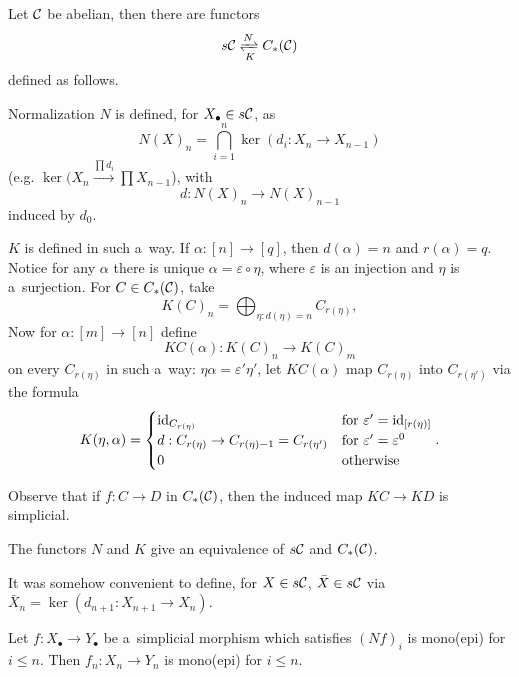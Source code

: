 \pagebreak    
    \begin{definition}
        Let $\mathcal{C}$ be abelian, then there are functors 
        $$ s\C \xrightleftharpoons[K]{N} C_\ast(\C)$$
        defined as follows.
        
        Normalization $N$ is defined, for $X_\bullet \in s\mathcal{C}$, as
        $$N(X)_n = \bigcap_{i=1}^n \ker(d_i:X_n \to X_{n-1})$$
        (e.g. $\ker (X_n \xrightarrow{\prod d_i} \prod X_{n-1}$),
        with $$d:N(X)_n \to N(X)_{n-1}$$
        induced by $d_0$.
        
        $K$ is defined in such a~way. 
        If $\alpha:[n]\to[q]$, then $d(\alpha) = n$ and $r(\alpha)=q$.
        Notice for any $\alpha$ there is unique
        $\alpha=\varepsilon \circ \eta$,
        where $\varepsilon$ is an injection and $\eta$ is a~surjection.
        For $C \in C_\ast(\mathcal{C})$, take
        $$K(C)_n = \bigoplus_{\eta:d(\eta)=n} C_{r(\eta)},$$
        Now for $\alpha :[m]\to[n]$
        define $$KC(\alpha):K(C)_n \to K(C)_m$$
        on every $C_{r(\eta)}$ in such a~way:
        $\eta \alpha = \varepsilon' \eta'$,
        let $KC(\alpha)$ map $C_{r(\eta)}$
        into $C_{r(\eta')}$
        via the formula
        $$K(\eta, \alpha) = 
        \begin{cases}
            \mathrm{id}_{C_{r(\eta)}} &\text{for }\varepsilon'=\mathrm{id}_{[r(\eta)]}\\
            d:C_{r(\eta)}\to C_{r(\eta)-1} = C_{r(\eta')} 
                &\text{for }\varepsilon'=\varepsilon^0 \\
            0 &\text{otherwise}
        \end{cases}.$$
    \end{definition}
    
    \begin{remark}
        Observe that if $f:C\to D$ in $C_\ast(\mathcal{C})$,
        then the induced map $KC \to KD$ is simplicial.
    \end{remark}
    
    \begin{theorem}
        The functors $N$ and $K$ give 
        an equivalence of $s\mathcal{C}$ and $C_\ast(\mathcal{C})$.
    \end{theorem}
    
    \begin{remark}
        It was somehow convenient to define,
        for $X \in s\mathcal{C}$, $\bar{X} \in s\mathcal{C}$
        via $\bar{X}_n = \ker(d_{n+1}:X_{n+1} \to X_n)$.
    \end{remark}
    
    \begin{lemma}
        Let $f:X_\bullet \to Y_\bullet$ be a~simplicial morphism 
        which satisfies $(Nf)_i$ is mono(epi) for $i \leq n$.
        Then $f_n:X_n \to Y_n$ is mono(epi) for $i \leq n$.
    \end{lemma}



 
 